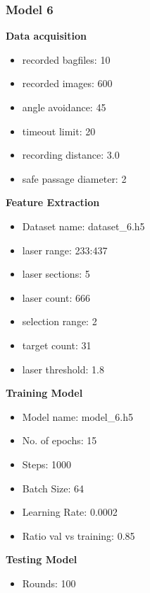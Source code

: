 \newpage
\subsubsection{Model 6\label{model_6} }
\begin{multicols}{2}\textbf{Data acquisition}
\begin{itemize}
\setlength\itemsep{0.1em}
\item recorded bagfiles: 10
\item recorded images: 600
\item angle avoidance: 45
\item timeout limit: 20
\item recording distance: 3.0
\item safe passage diameter: 2
\end{itemize}
\textbf{Feature Extraction}
\begin{itemize}
\setlength\itemsep{0.1em}
\item Dataset name: dataset\_6.h5
\item  laser range: 233:437
\item  laser sections: 5
\item  laser count: 666
\item  selection range: 2
\item  target count: 31
\item  laser threshold: 1.8
\end{itemize}
\columnbreak\textbf{Training Model}
\begin{itemize}
\setlength\itemsep{0.1em}
\item  Model name: model\_6.h5
\item  No. of epochs: 15
\item  Steps: 1000
\item  Batch Size: 64
\item  Learning Rate: 0.0002
\item  Ratio val vs training: 0.85
\end{itemize}
\textbf{Testing Model}
\begin{itemize}
\setlength\itemsep{0.1em}
\item Rounds: 100
\newline
\newline
\newline
\newline
\newline
\newline
\newline
\newline
\end{itemize}

\end{multicols}
